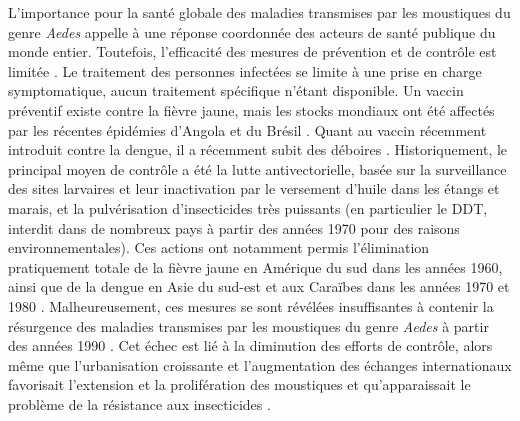 L'importance pour la santé globale des maladies transmises par les moustiques du genre {\em Aedes} appelle à une réponse coordonnée des acteurs de santé publique du monde entier.
Toutefois, l'efficacité des mesures de prévention et de contrôle est limitée \cite{lindsay2017improving}.
Le traitement des personnes infectées se limite à une prise en charge symptomatique, aucun traitement spécifique n'étant disponible.
Un vaccin préventif existe contre la fièvre jaune, mais les stocks mondiaux ont été affectés par les récentes épidémies d'Angola et du Brésil \cite{barrett2016yellow}.
Quant au vaccin récemment introduit contre la dengue, il a récemment subit des déboires \cite{denguevacc}.
Historiquement, le principal moyen de contrôle a été la lutte antivectorielle, basée sur la surveillance des sites larvaires et leur inactivation par le versement d'huile dans les étangs et marais, et la pulvérisation d'insecticides très puissants (en particulier le DDT, interdit dans de nombreux pays à partir des années 1970 pour des raisons environnementales).
Ces actions ont notamment permis l'élimination pratiquement totale de la fièvre jaune en Amérique du sud dans les années 1960, ainsi que de la dengue en Asie du sud-est et aux Caraïbes dans les années 1970 et 1980 \cite{camargo1967history}.
Malheureusement, ces mesures se sont révélées insuffisantes à contenir la résurgence des maladies transmises par les moustiques du genre {\em Aedes} à partir des années 1990 \cite{gubler2012dengue}.
Cet échec est lié à la diminution des efforts de contrôle, alors même que l'urbanisation croissante et l'augmentation des échanges internationaux favorisait l'extension et la prolifération des moustiques et qu'apparaissait le problème de la résistance aux insecticides \cite{vontas2012insecticide}.

